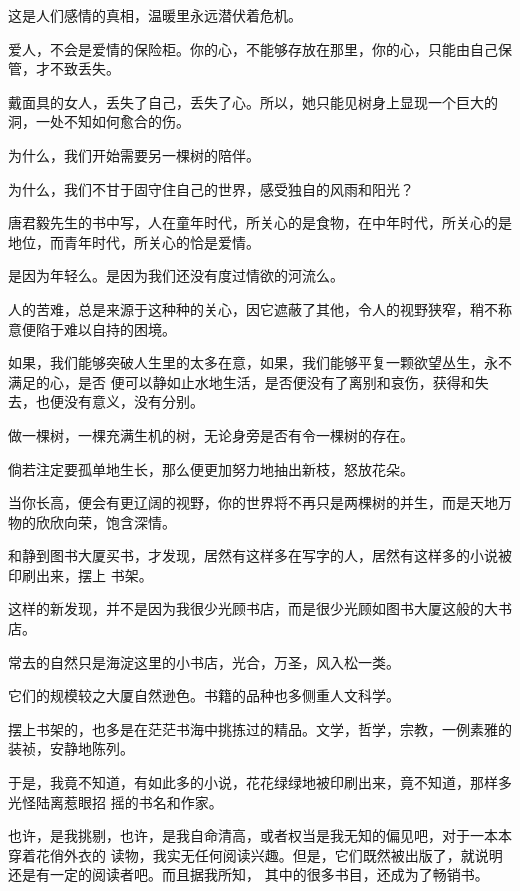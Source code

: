 		这是人们感情的真相，温暖里永远潜伏着危机。\par
		爱人，不会是爱情的保险柜。你的心，不能够存放在那里，你的心，只能由自己保管，才不致丢失。\par
		戴面具的女人，丢失了自己，丢失了心。所以，她只能见树身上显现一个巨大的洞，一处不知如何愈合的伤。

		为什么，我们开始需要另一棵树的陪伴。\par
		为什么，我们不甘于固守住自己的世界，感受独自的风雨和阳光？\par
		唐君毅先生的书中写，人在童年时代，所关心的是食物，在中年时代，所关心的是地位，而青年时代，所关心的恰是爱情。\par
		是因为年轻么。是因为我们还没有度过情欲的河流么。\par
		人的苦难，总是来源于这种种的关心，因它遮蔽了其他，令人的视野狭窄，稍不称意便陷于难以自持的困境。

		如果，我们能够突破人生里的太多在意，如果，我们能够平复一颗欲望丛生，永不满足的心，是否
	便可以静如止水地生活，是否便没有了离别和哀伤，获得和失去，也便没有意义，没有分别。

		做一棵树，一棵充满生机的树，无论身旁是否有令一棵树的存在。\par
		倘若注定要孤单地生长，那么便更加努力地抽出新枝，怒放花朵。\par
		当你长高，便会有更辽阔的视野，你的世界将不再只是两棵树的并生，而是天地万物的欣欣向荣，饱含深情。

	\endwriting




		和静到图书大厦买书，才发现，居然有这样多在写字的人，居然有这样多的小说被印刷出来，摆上
	书架。\par
		这样的新发现，并不是因为我很少光顾书店，而是很少光顾如图书大厦这般的大书店。

		常去的自然只是海淀这里的小书店，光合，万圣，风入松一类。\par
		它们的规模较之大厦自然逊色。书籍的品种也多侧重人文科学。\par
		摆上书架的，也多是在茫茫书海中挑拣过的精品。文学，哲学，宗教，一例素雅的装祯，安静地陈列。

		于是，我竟不知道，有如此多的小说，花花绿绿地被印刷出来，竟不知道，那样多光怪陆离惹眼招
	摇的书名和作家。

		也许，是我挑剔，也许，是我自命清高，或者权当是我无知的偏见吧，对于一本本穿着花俏外衣的
	读物，我实无任何阅读兴趣。但是，它们既然被出版了，就说明还是有一定的阅读者吧。而且据我所知，
	其中的很多书目，还成为了畅销书。

